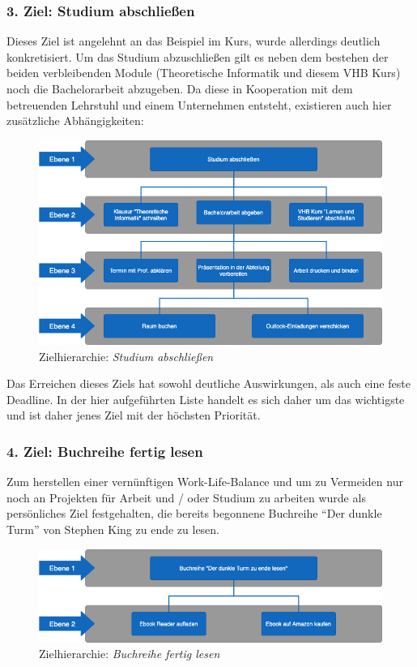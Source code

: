 \subsubsection{3. Ziel: Studium abschließen}
Dieses Ziel ist angelehnt an das Beispiel im Kurs, wurde allerdings deutlich konkretisiert. Um das Studium abzuschließen gilt es neben dem bestehen der beiden verbleibenden Module (Theoretische Informatik und diesem VHB Kurs) noch die Bachelorarbeit abzugeben. Da diese in Kooperation mit dem betreuenden Lehrstuhl und einem Unternehmen entsteht, existieren auch hier zusätzliche Abhängigkeiten:

\begin{figure}[htb]
	\includegraphics[width=\textwidth]{gfx/studium}
	\caption{Zielhierarchie: \textit{Studium abschließen}}
\end{figure}

Das Erreichen dieses Ziels hat sowohl deutliche Auswirkungen, als auch eine feste Deadline. In der hier aufgeführten Liste handelt es sich daher um das wichtigste und ist daher jenes Ziel mit der höchsten Priorität.

\subsubsection{4. Ziel: Buchreihe fertig lesen}
Zum herstellen einer vernünftigen Work-Life-Balance und um zu Vermeiden nur noch an Projekten für Arbeit und / oder Studium zu arbeiten wurde als persönliches Ziel festgehalten, die bereits begonnene Buchreihe “Der dunkle Turm” von Stephen King zu ende zu lesen.

\begin{figure}[htb]
	\includegraphics[width=\textwidth]{gfx/buchreihe}
	\caption{Zielhierarchie: \textit{Buchreihe fertig lesen}}
\end{figure}

